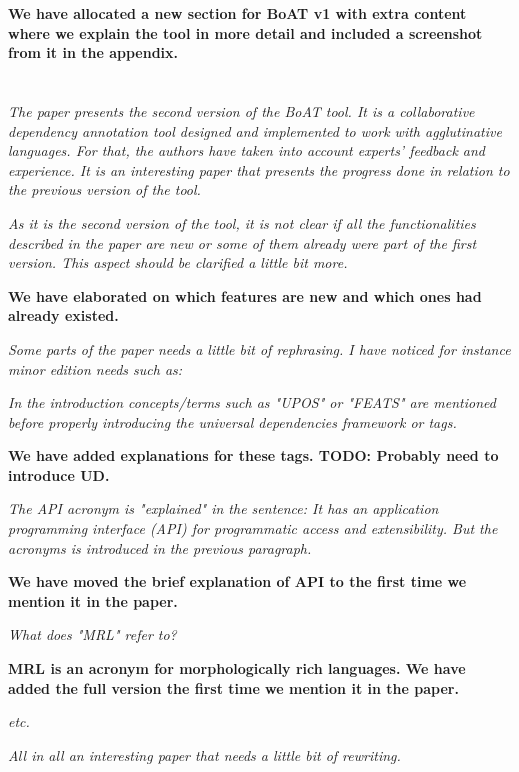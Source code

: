 \documentclass[final,2p]{article}
\newcommand{\comment}{\emph}
\newcommand{\response}{\noindent \textbf}
\begin{document}
\response{We have allocated a new section for BoAT v1 with extra content where we explain the tool in more detail and included a screenshot from it in the appendix.}

\section*{}

\comment{The paper presents the second version of the BoAT tool. It is a collaborative dependency annotation tool designed and implemented to work with agglutinative languages. For that, the authors have taken into account experts' feedback and experience. It is an interesting paper that presents the progress done in relation to the previous version of the tool.}

\comment{As it is the second version of the tool, it is not clear if all the functionalities described in the paper are new or some of them already were part of the first version. This aspect should be clarified a little bit more.}

\response{We have elaborated on which features are new and which ones had already existed.}

\comment{Some parts of the paper needs a little bit of rephrasing. I have noticed for instance minor edition needs such as:}

\comment{In the introduction concepts/terms such as "UPOS" or "FEATS" are mentioned before properly introducing the universal dependencies framework or tags.}

\response{We have added explanations for these tags. TODO: Probably need to introduce UD.}

\comment{The API acronym is "explained" in the sentence: It has an application programming interface (API) for programmatic access and extensibility. But the acronyms is introduced in the previous paragraph.}

\response{We have moved the brief explanation of API to the first time we mention it in the paper.}

\comment{What does "MRL" refer to?}

\response{MRL is an acronym for morphologically rich languages. We have added the full version the first time we mention it in the paper.}

\comment{etc.}

\comment{All in all an interesting paper that needs a little bit of rewriting.}
\end{document}
